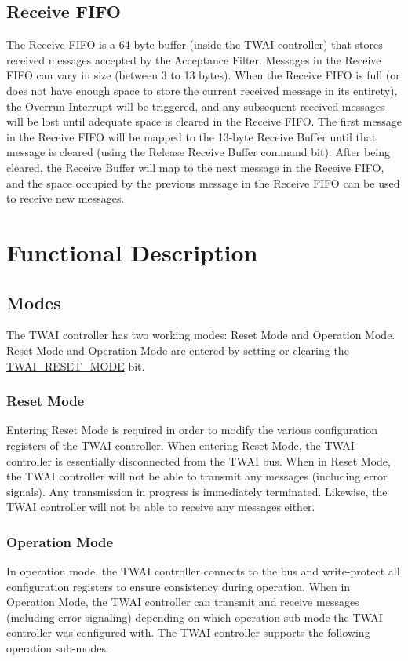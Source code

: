 \documentclass[main\_\_EN.tex]{subfiles}
\begin{document}
\subsection{Receive FIFO}
The Receive FIFO is a 64-byte buffer (inside the TWAI controller) that stores received messages accepted by the Acceptance Filter. Messages in the Receive FIFO can vary in size (between 3 to 13 bytes). When the Receive FIFO is full (or does not have enough space to store the current received message in its entirety), the Overrun Interrupt will be triggered, and any subsequent received messages will be lost until adequate space is cleared in the Receive FIFO. The first message in the Receive FIFO will be mapped to the 13-byte Receive Buffer until that message is cleared (using the Release Receive Buffer command bit). After being cleared, the Receive Buffer will map to the next message in the Receive FIFO, and the space occupied by the previous message in the Receive FIFO can be used to receive new messages.

\section{Functional Description}

\subsection{Modes}
\label{sec:twai-modes}
The \chipname{} TWAI controller has two working modes: Reset Mode and Operation Mode. Reset Mode and Operation Mode are entered by setting or clearing the \hyperref[fielddesc:TWAIRESETMODE]{TWAI\_RESET\_MODE} bit.

\subsubsection{Reset Mode}
Entering Reset Mode is required in order to modify the various configuration registers of the TWAI controller. When entering Reset Mode, the TWAI controller is essentially disconnected from the TWAI bus. When in Reset Mode, the TWAI controller will not be able to transmit any messages (including error signals). Any transmission in progress is immediately terminated. Likewise, the TWAI controller will not be able to receive any messages either.

\subsubsection{Operation Mode}
In operation mode, the TWAI controller connects to the bus and write-protect all configuration registers to ensure consistency during operation. When in Operation Mode, the TWAI controller can transmit and receive messages (including error signaling) depending on which operation sub-mode the TWAI controller was configured with. The TWAI controller supports the following operation sub-modes:
\end{document}

